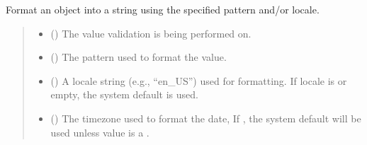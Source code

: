 \documentclass[letterpaper,10pt,english]{sphinxmanual}
\begin{document}
\begin{fulllineitems}
\begin{fulllineitems}
\label{\detokenize{apache_commons_validator_python.routines:apache_commons_validator_python.routines.abstract_calendar_validator.AbstractCalendarValidator.format}}
\pysigstartsignatures
{}
\pysigstopsignatures
\sphinxAtStartPar
Format an object into a string using the specified pattern and/or locale.
\begin{quote}\begin{description}
\begin{itemize}
\item {} 
\sphinxAtStartPar
{} () \textendash{} The value validation is being performed on.

\item {} 
\sphinxAtStartPar
{} () \textendash{} The pattern used to format the value.

\item {} 
\sphinxAtStartPar
{} () \textendash{} A locale string (e.g., “en\_US”) used for formatting.
If locale is  or empty, the system default is used.

\item {} 
\sphinxAtStartPar
{} () \textendash{} The timezone used to format the date,
If , the system default will be used unless value is a .


\end{itemize}
\end{description}
\end{quote}
\end{fulllineitems}
\end{fulllineitems}
\end{document}
